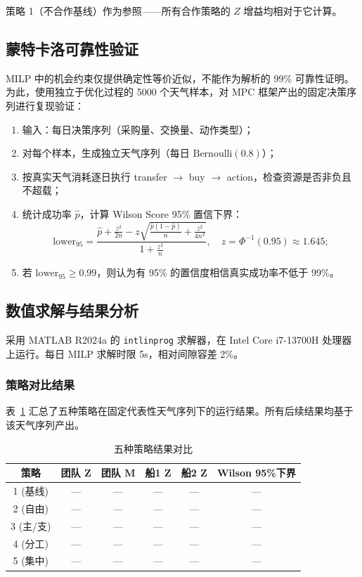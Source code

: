 策略 1（不合作基线）作为参照——所有合作策略的 $Z$ 增益均相对于它计算。

\subsection{蒙特卡洛可靠性验证}\label{sec:q4_mc}

MILP 中的机会约束仅提供确定性等价近似，不能作为解析的 99\% 可靠性证明。为此，使用独立于优化过程的 5000 个天气样本，对 MPC 框架产出的固定决策序列进行复现验证：

\begin{enumerate}
    \item 输入：每日决策序列（采购量、交换量、动作类型）；
    \item 对每个样本，生成独立天气序列（每日 $\mathrm{Bernoulli}(0.8)$）；
    \item 按真实天气消耗逐日执行 transfer $\to$ buy $\to$ action，检查资源是否非负且不超载；
    \item 统计成功率 $\hat{p}$，计算 Wilson Score 95\% 置信下界：
    \begin{equation}
    \mathrm{lower}_{95} = \frac{\hat{p} + \frac{z^2}{2n} - z\sqrt{\frac{\hat{p}(1-\hat{p})}{n}+\frac{z^2}{4n^2}}}{1+\frac{z^2}{n}},\quad z=\Phi^{-1}(0.95)\approx1.645;
    \end{equation}
    \item 若 $\mathrm{lower}_{95} \geq 0.99$，则认为有 95\% 的置信度相信真实成功率不低于 99\%。
\end{enumerate}

\subsection{数值求解与结果分析}

采用 MATLAB R2024a 的 \texttt{intlinprog} 求解器，在 Intel Core i7-13700H 处理器上运行。每日 MILP 求解时限 5s，相对间隙容差 2\%。

\subsubsection{策略对比结果}

表~\ref{tab:strategy_results} 汇总了五种策略在固定代表性天气序列下的运行结果。所有后续结果均基于该天气序列产出。

\begin{table}[htbp]
\centering
\caption{五种策略结果对比}
\label{tab:strategy_results}
\begin{tabular}{c|c|c|c|c|c}
\toprule
策略 & 团队 Z & 团队 M & 船1 Z & 船2 Z & Wilson 95\%下界 \\
\midrule
1 (基线)  & --- & --- & --- & --- & --- \\
2 (自由)  & --- & --- & --- & --- & --- \\
3 (主/支) & --- & --- & --- & --- & --- \\
4 (分工)  & --- & --- & --- & --- & --- \\
5 (集中)  & --- & --- & --- & --- & --- \\
\bottomrule
\end{tabular}
\end{table}

